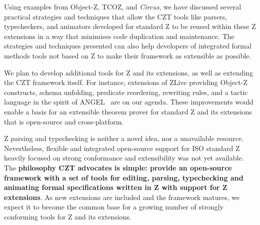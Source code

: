 \documentclass{llncs}
\newcommand{\Circus}{{\sf\slshape Circus}}
\begin{document}
  Using examples from Object-Z, TCOZ, and \Circus, we have discussed
  several practical strategies and techniques that allow the CZT tools
  like parsers, typecheckers, and animators developed for standard Z
  to be reused within these Z extensions in a way that minimises code
  duplication and maintenance.  The strategies and techniques
  presented can also help developers of integrated formal methods
  tools not based on Z to make their framework as extensible as
  possible.

  We plan to develop additional tools for Z and its extensions,
  as well as extending the CZT framework itself.
  For instance, extensions of ZLive providing Object-Z constructs,
  schema unfolding, predicate reordering, rewriting rules, and
  a tactic language in the spirit of ANGEL~\cite{z.others:angel} are
  on our agenda. These improvements would enable a basis for an extensible
  theorem prover for standard Z and its extensions that is open-source and
  cross-platform.

  Z parsing and typechecking is neither a novel idea, nor a
  unavailable resource.  Nevertheless, flexible and integrated
  open-source support for ISO standard Z heavily focused
  on strong conformance and extensibility was not yet available.
  The \textbf{philosophy CZT advocates is simple: provide an
  open-source framework with a set of tools for editing, parsing,
  typechecking and animating formal specifications written in Z with
  support for Z extensions}.  As new extensions are included and the
  framework matures, we expect it to become the common base for a
  growing number of strongly conforming tools for Z and its extensions.



\end{document}
